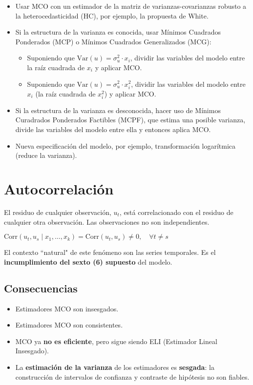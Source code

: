 \documentclass[10pt, a4paper, landscape]{extarticle}
\newcommand{\Var}{\mathrm{Var}}
\newcommand{\Corr}{\mathrm{Corr}}
\begin{document}
\begin{multicols}{3}
\begin{itemize}[leftmargin=*]
	\item Usar MCO con un estimador de la matriz de varianzas-covarianzas robusto a la heterocedasticidad (HC), por ejemplo, la propuesta de White.
	\item Si la estructura de la varianza es conocida, usar Mínimos Cuadrados Ponderados (MCP) o Mínimos Cuadrados Generalizados (MCG):
	\begin{itemize}[leftmargin=*]
		\item Suponiendo que $\Var(u) = \sigma^2_u \cdot x_i$, dividir las variables del modelo entre la raíz cuadrada de $x_i$ y aplicar MCO.
		\item Suponiendo que $\Var(u) = \sigma^2_u \cdot x_i^2$, dividir las variables del modelo entre $x_i$ (la raíz cuadrada de $x_i^2$) y aplicar MCO.
	\end{itemize}
	\item Si la estructura de la varianza es desconocida, hacer uso de Mínimos Curadrados Ponderados Factibles (MCPF), que estima una posible varianza, divide las variables del modelo entre ella y entonces aplica MCO.
	\item Nueva especificación del modelo, por ejemplo, transformación logarítmica (reduce la varianza).
\end{itemize}

\columnbreak

\section*{Autocorrelación}

El residuo de cualquier observación, $u_t$, está correlacionado con el residuo de cualquier otra observación. Las observaciones no son independientes.

\begin{center}
	$\Corr(u_t, u_s \mid x_1, \ldots, x_k) = \Corr(u_t, u_s) \neq 0, \quad \forall t \neq s$
\end{center}

El contexto ``natural" de este fenómeno son las series temporales. Es el \textbf{incumplimiento del sexto (6) supuesto} del modelo.

\subsection*{Consecuencias}

\begin{itemize}[leftmargin=*]
	\item Estimadores MCO son insesgados.
	\item Estimadores MCO son consistentes.
	\item MCO ya \textbf{no es eficiente}, pero sigue siendo ELI (Estimador Lineal Insesgado).
	\item La \textbf{estimación de la varianza} de los estimadores es \textbf{sesgada}: la construcción de intervalos de confianza y contraste de hipótesis no son fiables.
\end{itemize}


\end{multicols}
\end{document}
